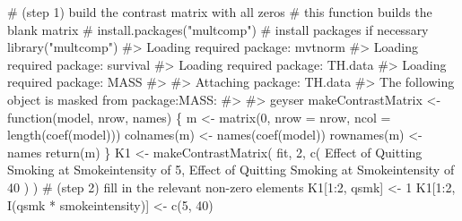 \documentclass[
  10pt,
  a4paper,
]{book}
\newenvironment{Shaded}{\begin{snugshade}}{\end{snugshade}}
\newcommand{\AttributeTok}[1]{\textcolor[rgb]{0.40,0.45,0.13}{#1}}
\newcommand{\CommentTok}[1]{\textcolor[rgb]{0.37,0.37,0.37}{#1}}
\newcommand{\ControlFlowTok}[1]{\textcolor[rgb]{0.00,0.46,0.62}{#1}}
\newcommand{\DecValTok}[1]{\textcolor[rgb]{0.68,0.00,0.00}{#1}}
\newcommand{\FunctionTok}[1]{\textcolor[rgb]{0.28,0.35,0.67}{#1}}
\newcommand{\NormalTok}[1]{\textcolor[rgb]{0.00,0.46,0.62}{#1}}
\newcommand{\OtherTok}[1]{\textcolor[rgb]{0.00,0.46,0.62}{#1}}
\newcommand{\SpecialCharTok}[1]{\textcolor[rgb]{0.37,0.37,0.37}{#1}}
\newcommand{\StringTok}[1]{\textcolor[rgb]{0.13,0.47,0.30}{#1}}
\begin{document}
\begin{Shaded}
\begin{Highlighting}[]
\CommentTok{\# (step 1) build the contrast matrix with all zeros}
\CommentTok{\# this function builds the blank matrix}
\CommentTok{\# install.packages("multcomp") \# install packages if necessary}
\FunctionTok{library}\NormalTok{(}\StringTok{"multcomp"}\NormalTok{)}
\CommentTok{\#\textgreater{} Loading required package: mvtnorm}
\CommentTok{\#\textgreater{} Loading required package: survival}
\CommentTok{\#\textgreater{} Loading required package: TH.data}
\CommentTok{\#\textgreater{} Loading required package: MASS}
\CommentTok{\#\textgreater{} }
\CommentTok{\#\textgreater{} Attaching package: \textquotesingle{}TH.data\textquotesingle{}}
\CommentTok{\#\textgreater{} The following object is masked from \textquotesingle{}package:MASS\textquotesingle{}:}
\CommentTok{\#\textgreater{} }
\CommentTok{\#\textgreater{}     geyser}
\NormalTok{makeContrastMatrix }\OtherTok{\textless{}{-}} \ControlFlowTok{function}\NormalTok{(model, nrow, names) \{}
\NormalTok{  m }\OtherTok{\textless{}{-}} \FunctionTok{matrix}\NormalTok{(}\DecValTok{0}\NormalTok{, }\AttributeTok{nrow =}\NormalTok{ nrow, }\AttributeTok{ncol =} \FunctionTok{length}\NormalTok{(}\FunctionTok{coef}\NormalTok{(model)))}
  \FunctionTok{colnames}\NormalTok{(m) }\OtherTok{\textless{}{-}} \FunctionTok{names}\NormalTok{(}\FunctionTok{coef}\NormalTok{(model))}
  \FunctionTok{rownames}\NormalTok{(m) }\OtherTok{\textless{}{-}}\NormalTok{ names}
  \FunctionTok{return}\NormalTok{(m)}
\NormalTok{\}}
\NormalTok{K1 }\OtherTok{\textless{}{-}}
  \FunctionTok{makeContrastMatrix}\NormalTok{(}
\NormalTok{    fit,}
    \DecValTok{2}\NormalTok{,}
    \FunctionTok{c}\NormalTok{(}
      \StringTok{\textquotesingle{}Effect of Quitting Smoking at Smokeintensity of 5\textquotesingle{}}\NormalTok{,}
      \StringTok{\textquotesingle{}Effect of Quitting Smoking at Smokeintensity of 40\textquotesingle{}}
\NormalTok{    )}
\NormalTok{  )}
\CommentTok{\# (step 2) fill in the relevant non{-}zero elements}
\NormalTok{K1[}\DecValTok{1}\SpecialCharTok{:}\DecValTok{2}\NormalTok{, }\StringTok{\textquotesingle{}qsmk\textquotesingle{}}\NormalTok{] }\OtherTok{\textless{}{-}} \DecValTok{1}
\NormalTok{K1[}\DecValTok{1}\SpecialCharTok{:}\DecValTok{2}\NormalTok{, }\StringTok{\textquotesingle{}I(qsmk * smokeintensity)\textquotesingle{}}\NormalTok{] }\OtherTok{\textless{}{-}} \FunctionTok{c}\NormalTok{(}\DecValTok{5}\NormalTok{, }\DecValTok{40}\NormalTok{)}


\end{Highlighting}
\end{Shaded}
\end{document}
